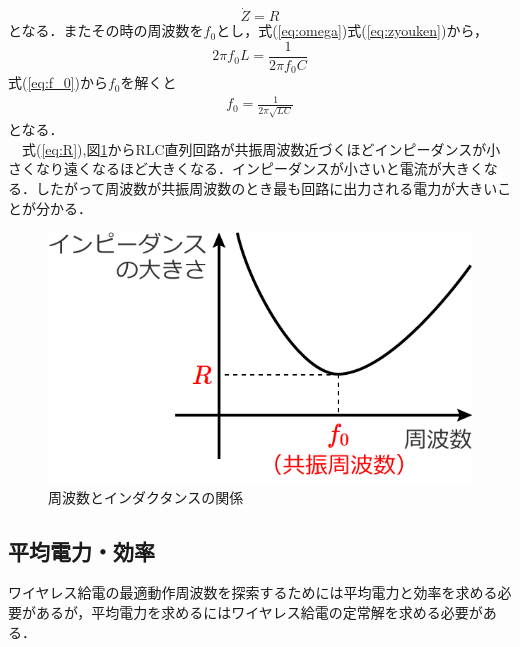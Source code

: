 \documentclass[12pt]{jarticle}
\begin{document}
\begin{equation}
\dot{Z}=R
\label{eq:R}
\end{equation}
となる．またその時の周波数を$f_0$とし，式(\ref{eq:omega})式(\ref{eq:zyouken})から，
\begin{equation}
2 \pi f_0L=\frac{1}{2 \pi f_0C}
\label{eq:f_0}
\end{equation}
式(\ref{eq:f_0})から$f_0を解くと$
\begin{eqnarray}
f_0=\frac{1}{2 \pi\sqrt{LC}}
\label{eq:kyousin}
\end{eqnarray}
となる．
\\　式(\ref{eq:R}),図\ref{fig:RLCkyosin}からRLC直列回路が共振周波数近づくほどインピーダンスが小さくなり遠くなるほど大きくなる．インピーダンスが小さいと電流が大きくなる．したがって周波数が共振周波数のとき最も回路に出力される電力が大きいことが分かる．
\begin{figure}[H]
	\centering
	\includegraphics[scale=0.5]{RLCkyousin.png}
	\caption{周波数とインダクタンスの関係}
	\label{fig:RLCkyosin}
\end{figure}
\subsection{平均電力・効率}
ワイヤレス給電の最適動作周波数を探索するためには平均電力と効率を求める必要があるが，平均電力を求めるにはワイヤレス給電の定常解を求める必要がある．
\end{document}
